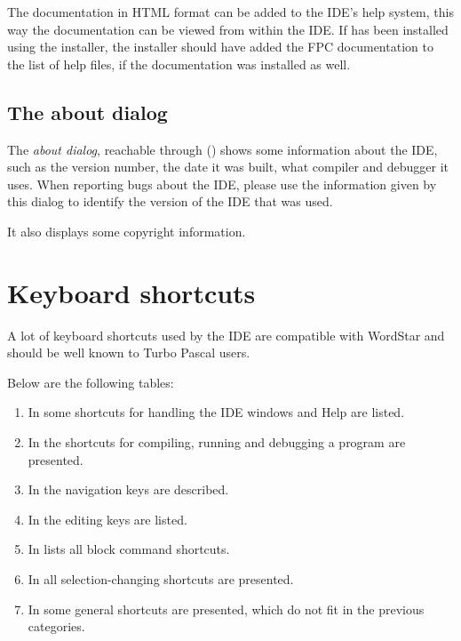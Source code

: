 The \fpc documentation in HTML format can be added to the IDE's help system,
this way the documentation can be viewed from within the IDE. If \fpc has
been installed using the installer, the installer should have added the 
FPC documentation to the list of help files, if the documentation was
installed as well.

%
%
\subsection{The about dialog}
\label{se:about}
The {\em about dialog}, reachable through () shows some 
information about the IDE, such as the version number, the date it was built,
what compiler and debugger it uses. When reporting bugs about the IDE, please 
use the information given by this dialog to identify the version of the IDE
that was used.

It also displays some copyright information.

\section{Keyboard shortcuts}
\label{se:keyshortcuts}
A lot of keyboard shortcuts used by the IDE are compatible with 
WordStar and should be well known to Turbo Pascal users.

Below are the following tables:
\begin{enumerate}
\item In  some shortcuts for handling the IDE windows
and Help are listed.
\item In  the shortcuts for compiling, running and
debugging a program are presented.
\item In  the navigation keys are described.
\item In  the editing keys are listed.
\item In  lists all block command shortcuts.
\item In  all selection-changing shortcuts are 
presented.
\item In  some general shortcuts are presented, 
which do not fit in the previous categories.
\end{enumerate}

